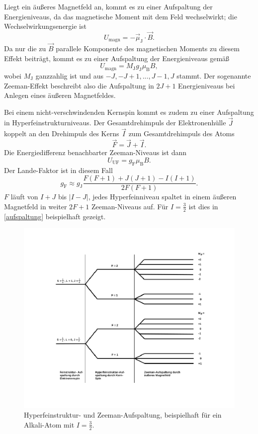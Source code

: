 Liegt ein äußeres Magnetfeld an, kommt es zu einer Aufspaltung der Energieniveaus, da das magnetische Moment mit dem Feld
wechselwirkt; die Wechselwirkungsenergie ist
\begin{equation}
  U_\text{magn} = -\vec{\mu}_\text{J}\cdot\vec{B}.
\end{equation}
Da nur die zu $\vec{B}$ parallele Komponente des magnetischen Moments zu diesem Effekt beiträgt, kommt es zu einer Aufspaltung
der Energieniveaus gemäß
\begin{equation}
  U_\text{magn} = M_\text{J}g_\text{J}\mu_\text{B}B,
\end{equation}
wobei $M_\text{J}$ ganzzahlig ist und aus $-J, -J+1, ..., J-1, J$ stammt. Der sogenannte Zeeman-Effekt beschreibt also die
Aufspaltung in $2J+1$ Energieniveaus bei Anlegen eines äußeren Magnetfeldes.

Bei einem nicht-verschwindenden Kernspin kommt es zudem zu einer Aufspaltung in Hyperfeinstrukturniveaus.
Der Gesamtdrehimpuls der Elektronenhülle $\vec{J}$ koppelt an den Drehimpuls des Kerns $\vec{I}$ zum Gesamtdrehimpuls des Atoms
\begin{equation}
  \vec{F} = \vec{J} + \vec{I}.
\end{equation}
Die Energiedifferenz benachbarter Zeeman-Niveaus ist dann
\begin{equation}
  U_\text{UF} = g_\text{F}\mu_\text{B}B.
\end{equation}
Der Lande-Faktor ist in diesem Fall
\begin{equation}
  g_\text{F} \approx g_\text{J}\frac{F(F+1)+J(J+1)-I(I+1)}{2F(F+1)}.
\end{equation}
$F$ läuft von $I+J$ bis $|I-J|$, jedes Hyperfeinniveau spaltet in einem äußeren Magnetfeld in weiter $2F+1$ Zeeman-Niveaus
auf. Für $I=\frac{3}{2}$ ist dies in \autoref{aufspaltung} beispielhaft gezeigt.
\begin{figure}
  \includegraphics{./img/aufspaltung.pdf}
  \caption{Hyperfeinstruktur- und Zeeman-Aufspaltung, beispielhaft für ein Alkali-Atom mit $I=\frac{3}{2}$.}
  \label{aufspaltung}
\end{figure}

